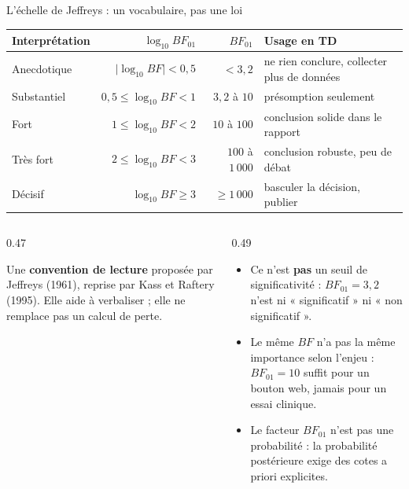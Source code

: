 \begin{frame}{L'échelle de Jeffreys : un vocabulaire, pas une loi}
\begin{center}
\small
\begin{tabular}{@{}p{2.9cm}rrp{6.0cm}@{}}
\toprule
\textbf{Interprétation} & $\log_{10} BF_{01}$ & $BF_{01}$ & \textbf{Usage en TD} \\
\midrule
Anecdotique   & $\vert\log_{10} BF\vert < 0{,}5$ & $< 3{,}2$    & ne rien conclure, collecter plus de données \\
Substantiel   & $0{,}5 \le \log_{10} BF < 1$    & $3{,}2$ à $10$  & présomption seulement \\
Fort          & $1 \le \log_{10} BF < 2$        & $10$ à $100$    & conclusion solide dans le rapport \\
Très fort     & $2 \le \log_{10} BF < 3$        & $100$ à $1\,000$ & conclusion robuste, peu de débat \\
Décisif       & $\log_{10} BF \ge 3$            & $\ge 1\,000$    & basculer la décision, publier \\
\bottomrule
\end{tabular}
\end{center}
\vspace{1mm}
\begin{columns}[t]
\begin{column}{0.47\textwidth}
\begin{kbox}
Une \textbf{convention de lecture} proposée par Jeffreys (1961), reprise par Kass et Raftery (1995).
Elle aide à verbaliser ; elle ne remplace pas un calcul de perte.
\end{kbox}
\end{column}
\begin{column}{0.49\textwidth}
\begin{wbox}
\begin{itemize}
  \item Ce n'est \textbf{pas} un seuil de significativité : $BF_{01} = 3{,}2$ n'est ni
        « significatif » ni « non significatif ».
  \item Le même $BF$ n'a pas la même importance selon l'enjeu :
        $BF_{01} = 10$ suffit pour un bouton web, jamais pour un essai clinique.
  \item Le facteur $BF_{01}$ n'est pas une probabilité : la probabilité postérieure
        exige des cotes a priori explicites.
\end{itemize}
\end{wbox}
\end{column}
\end{columns}
\end{frame}

